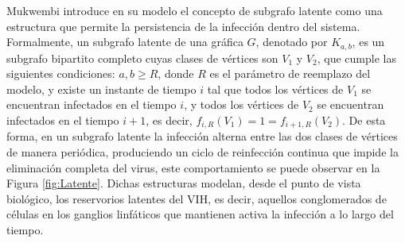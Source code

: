 \documentclass[12pt,titlepage,twoside,openright]{book}
\begin{document}
Mukwembi introduce en su modelo \cite{Mukwembi} el concepto de subgrafo latente como una estructura que permite la persistencia de la infecci\'on dentro del sistema. Formalmente, un subgrafo latente de una gr\'afica $G$, denotado por $K_{a,b}$, es un subgrafo bipartito completo cuyas clases de v\'ertices son $V_1$ y $V_2$, que cumple las siguientes condiciones: $a,b \geq R$, donde $R$ es el par\'ametro de reemplazo del modelo, y existe un instante de tiempo $i$ tal que todos los v\'ertices de $V_1$ se encuentran infectados en el tiempo $i$, y todos los v\'ertices de $V_2$ se encuentran infectados en el tiempo $i+1$, es decir, $f_{i,R}(V_1)=1=f_{i+1,R}(V_2)$. De esta forma, en un subgrafo latente la infecci\'on alterna entre las dos clases de v\'ertices de manera peri\'odica, produciendo un ciclo de reinfecci\'on continua que impide la eliminaci\'on completa del virus, este comportamiento se puede observar en la Figura \ref{fig:Latente}. Dichas estructuras modelan, desde el punto de vista biol\'ogico, los reservorios latentes del VIH, es decir, aquellos conglomerados de c\'elulas en los ganglios linf\'aticos que mantienen activa la infecci\'on a lo largo del tiempo.
\end{document}
